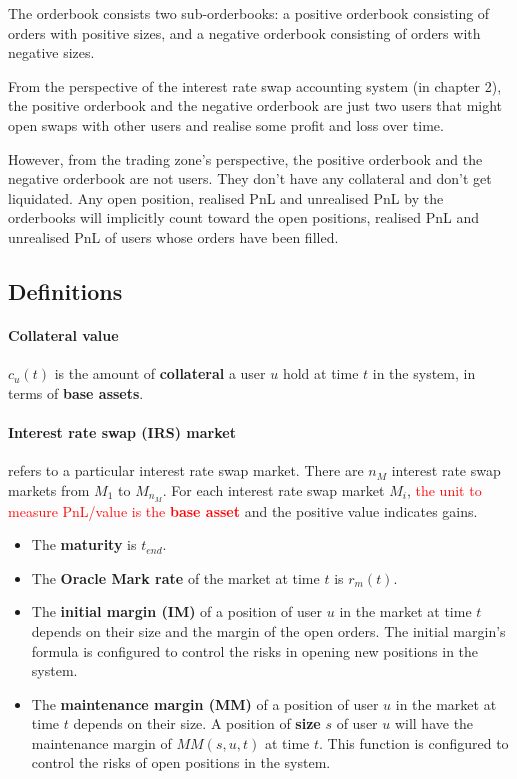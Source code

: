 \documentclass{article}%
\begin{document}
The orderbook consists two sub-orderbooks: a positive orderbook consisting of orders with positive sizes, and a negative orderbook consisting of orders with negative sizes.

From the perspective of the interest rate swap accounting system (in chapter 2), the positive orderbook and the negative orderbook are just two users that might open swaps with other users and realise some profit and loss over time.

However, from the trading zone's perspective, the positive orderbook and the negative orderbook are not users. They don't have any collateral and don't get liquidated. Any open position, realised PnL and unrealised PnL by the orderbooks will implicitly count toward the open positions, realised PnL and unrealised PnL of users whose orders have been filled.

\subsection{Definitions}
\paragraph{Collateral value} $c_u(t)$ is the amount of \textbf{collateral} a user $u$ hold at time $t$ in the system, in terms of \textbf{base assets}. 

\paragraph{Interest rate swap (IRS) market} refers to a particular interest rate swap market. There are $n_M$ interest rate swap markets from $M_1$ to $M_{n_M}$. For each interest rate swap market $M_i$, \textcolor{red}{the unit to measure PnL/value is the \textbf{base asset}} and the positive value indicates gains.
\begin{itemize}
    \item The \textbf{maturity} is $t_{end}$.
    \item The \textbf{Oracle Mark rate} of the market at time $t$ is $r_m(t)$.
    \item The \textbf{initial margin (IM)} of a position of user $u$ in the market at time $t$ depends on their size and the margin of the open orders. The initial margin's formula is configured to control the risks in opening new positions in the system.
    \item The \textbf{maintenance margin (MM)} of a position of user $u$ in the market at time $t$ depends on their size. A position of \textbf{size} $s$ of user $u$ will have the maintenance margin of $MM(s, u, t)$ at time $t$. This function is configured to control the risks of open positions in the system.
\end{itemize}
\end{document}
